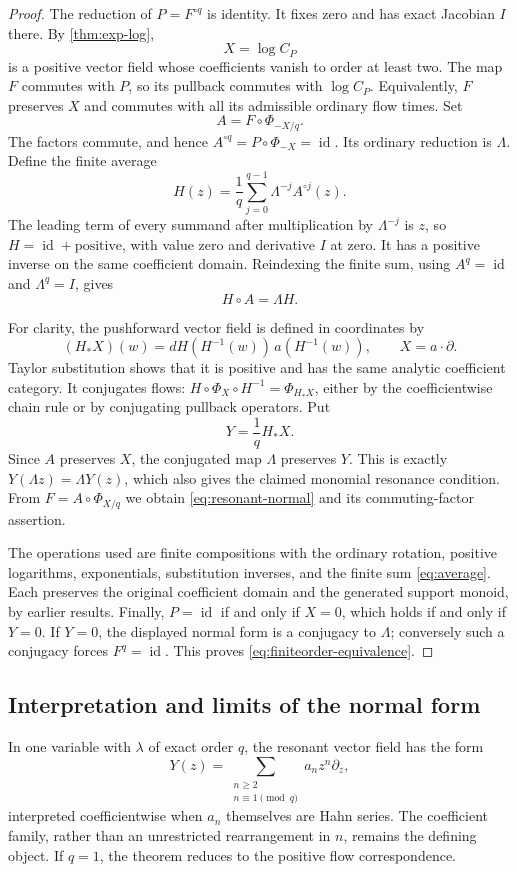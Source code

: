 \documentclass[11pt,letterpaper]{article}
\theoremstyle{definition}
\theoremstyle{remark}
\newcommand{\id}{\operatorname{id}}
\numberwithin{equation}{section}
\begin{document}
\begin{proof}
The reduction of $P=F^{\circ q}$ is identity. It fixes zero and has exact
Jacobian $I$ there. By \cref{thm:exp-log},
\[
 X=\log C_P
\]
is a positive vector field whose coefficients vanish to order at least two.
The map $F$ commutes with $P$, so its pullback commutes with $\log C_P$.
Equivalently, $F$ preserves $X$ and commutes with all its admissible ordinary
flow times. Set
\begin{equation}\label{eq:Afinite}
 A=F\circ\Phi_{-X/q}.
\end{equation}
The factors commute, and hence
$A^{\circ q}=P\circ\Phi_{-X}=\id$. Its ordinary reduction is $\Lambda$.
Define the finite average
\begin{equation}\label{eq:average}
 H(z)=\frac1q\sum_{j=0}^{q-1}\Lambda^{-j}A^{\circ j}(z).
\end{equation}
The leading term of every summand after multiplication by $\Lambda^{-j}$
is $z$, so $H=\id+\text{positive}$, with value zero and derivative $I$ at
zero. It has a positive inverse on the same coefficient domain. Reindexing
the finite sum, using $A^q=\id$ and $\Lambda^q=I$, gives
\[
 H\circ A=\Lambda H.
\]

For clarity, the pushforward vector field is defined in coordinates by
\[
 (H_*X)(w)=dH(H^{-1}(w))\,a(H^{-1}(w)),\qquad X=a\cdot\partial.
\]
Taylor substitution shows that it is positive and has the same analytic
coefficient category. It conjugates flows:
$H\circ\Phi_X\circ H^{-1}=\Phi_{H_*X}$, either by the coefficientwise
chain rule or by conjugating pullback operators. Put
\[
 Y=\frac1qH_*X.
\]
Since $A$ preserves $X$, the conjugated map $\Lambda$ preserves $Y$.
This is exactly $Y(\Lambda z)=\Lambda Y(z)$, which also gives the claimed
monomial resonance condition. From $F=A\circ\Phi_{X/q}$ we obtain
\eqref{eq:resonant-normal} and its commuting-factor assertion.

The operations used are finite compositions with the ordinary rotation,
positive logarithms, exponentials, substitution inverses, and the finite
sum \eqref{eq:average}. Each preserves the original coefficient domain and
the generated support monoid, by earlier results. Finally, $P=\id$ if and
only if $X=0$, which holds if and only if $Y=0$. If $Y=0$, the displayed
normal form is a conjugacy to $\Lambda$; conversely such a conjugacy forces
$F^q=\id$. This proves \eqref{eq:finiteorder-equivalence}.
\end{proof}

\subsection{Interpretation and limits of the normal form}
In one variable with $\lambda$ of exact order $q$, the resonant vector
field has the form
\[
 Y(z)=\sum_{\substack{n\ge2\\n\equiv1\pmod q}}a_n z^n\partial_z,
\]
interpreted coefficientwise when $a_n$ themselves are Hahn series.
The coefficient family, rather than an unrestricted rearrangement in $n$,
remains the defining object. If $q=1$, the theorem reduces to the positive
flow correspondence.
\end{document}
